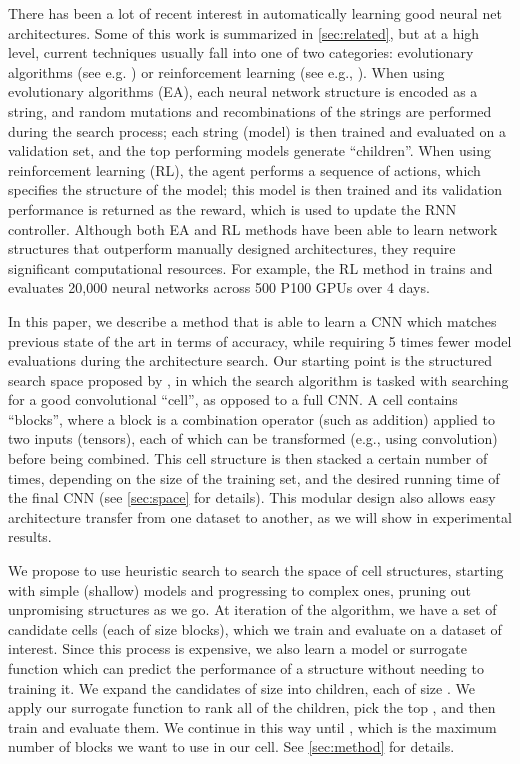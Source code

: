 \documentclass[runningheads]{llncs}
\begin{document}
There has been a lot of recent interest in automatically learning good neural net architectures.
Some of this work is summarized in \cref{sec:related}, but at a high level,
current techniques
usually fall into one of two categories: evolutionary algorithms 
(see e.g. \cite{DBLP:conf/icml/RealMSSSTLK17,Miikkulainen2017,DBLP:journals/corr/XieY17})
or reinforcement learning
(see e.g., \cite{DBLP:journals/corr/ZophL16,DBLP:journals/corr/ZophVSL17,Zhong2018,Cai2017,DBLP:journals/corr/BakerGNR16}).
When using evolutionary algorithms (EA), each neural network structure is encoded as a string, and random mutations and recombinations of the strings are performed during the search process;
each string (model) is then trained and evaluated on a validation set,
and the top performing models generate  ``children''.
When using reinforcement learning (RL),  the agent performs a sequence of actions, which specifies the structure of the model; this model is then trained and its validation performance is returned as the reward, which is used to update the RNN controller.
Although both EA and RL methods have been able to learn network structures that outperform manually designed architectures, they require significant computational resources.
For example, the RL method in
\cite{DBLP:journals/corr/ZophVSL17} 
trains and evaluates 20,000 neural networks across 500 P100 GPUs over 4 days.


In this paper, we describe a method that is able to learn a CNN which matches previous state of the art in terms of accuracy,
while requiring 5 times fewer model evaluations during the architecture search.
Our starting point is the structured search space
proposed by \cite{DBLP:journals/corr/ZophVSL17}, in which the search algorithm is tasked with searching for a good convolutional ``cell'', as opposed to a full CNN.
A cell contains  ``blocks'', where a block is a combination operator (such as addition) applied to two inputs (tensors), each of which can be transformed (e.g., using convolution) before being combined.
This cell structure is then stacked a certain number of times, depending on the size of the training set, and the desired running time of the final CNN
(see \cref{sec:space} for details).
This modular design also allows easy architecture transfer from one dataset to another,
as we will show in experimental results.


We propose to use  heuristic search to search the space of cell structures,
starting with simple (shallow) models and progressing to complex ones, pruning out unpromising structures as we go.
At iteration  of the algorithm, we have a set of  candidate cells (each of size  blocks), which we train and evaluate on a dataset of interest. Since this process is expensive,
we also learn a model or surrogate function which can predict the performance of a structure
without needing to training it.
We expand the  candidates of size  into  children, each of size .
We apply our surrogate function to rank all of the  children,
pick the top , and then train and evaluate them.
We continue in this way until , which is the maximum number of blocks we want to use in our cell.
See \cref{sec:method} for details.
\end{document}
